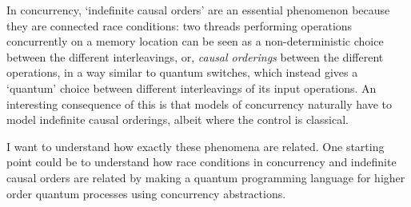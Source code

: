 \documentclass[11pt,a4paper]{article}
\begin{document}
In concurrency, `indefinite causal orders' are an essential phenomenon because they are connected race conditions: two threads performing operations concurrently on a memory location can be seen as a non-deterministic choice between the different interleavings, or, \emph{causal orderings} between the different operations, in a way similar to quantum switches, which instead gives a `quantum' choice between different interleavings of its input operations. An interesting consequence of this is that models of concurrency naturally have to model indefinite causal orderings, albeit where the control is classical. 

I want to understand how exactly these phenomena are related. One starting point could be to understand how race conditions in concurrency and indefinite causal orders are related by making a quantum programming language for higher order quantum processes using concurrency abstractions. 


\end{document}

